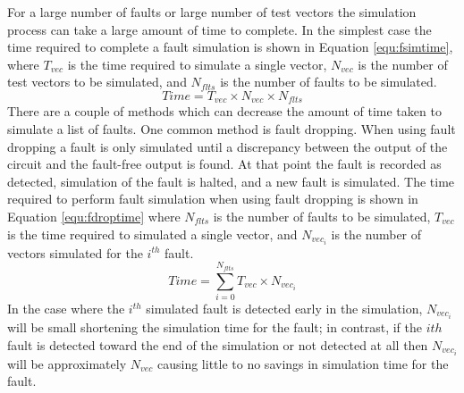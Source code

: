 \documentclass[12pt]{report}
\begin{document}
For a large number of faults or large number of test vectors the simulation process can take a large amount of time to complete. In the simplest case the time required to complete a fault simulation is shown in Equation \ref{equ:fsimtime}, where $T_{vec}$ is the time required to simulate a single vector, $N_{vec}$ is the number of test vectors to be simulated, and $N_{flts}$ is the number of faults to be simulated\cite{needed-fsimtime}.  
\begin{equation}
Time = T_{vec} \times N_{vec} \times N_{flts}
\label{equ:fsimtime}
\end{equation}
There are a couple of methods which can decrease the amount of time taken to simulate a list of faults.  One common method is fault dropping.  When using fault dropping a fault is only simulated until a discrepancy between the output of the circuit and the fault-free output is found.  At that point the fault is recorded as detected, simulation of the fault is halted, and a new fault is simulated\cite{stroud}.  The time required to perform fault simulation when using fault dropping is shown in Equation \ref{equ:fdroptime} where $N_{flts}$ is the number of faults to be simulated, $T_{vec}$ is the time required to simulated a single vector, and $N_{vec_i}$ is the number of vectors simulated for the $i^{th}$ fault\cite{needed-fdroptime}.
\begin{equation}
Time =  \sum_{i=0}^{N_{flts}} T_{vec} \times N_{vec_i}
\label{equ:fdroptime}
\end{equation}
In the case where the $i^{th}$ simulated fault is detected early in the simulation, $N_{vec_i}$ will be small shortening the simulation time for the fault; in contrast, if the $ith$ fault is detected toward the end of the simulation or not detected at all then $N_{vec_i}$ will be approximately $N_{vec}$ causing little to no savings in simulation time for the fault\cite{stroud}.  
\end{document}
